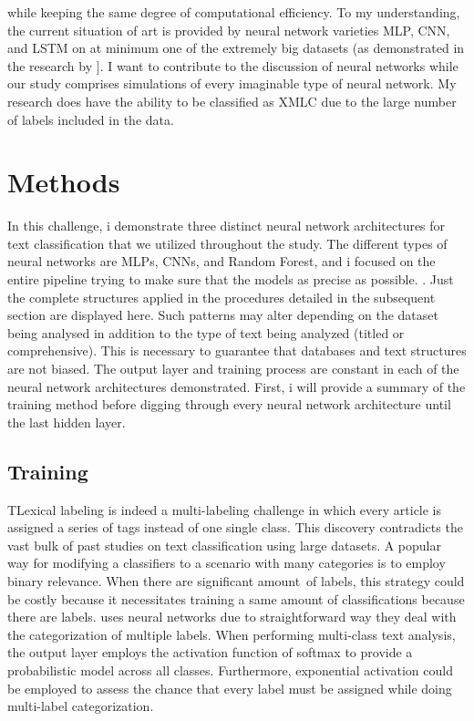 \documentclass[a4paper]{article}
\begin{document}
while keeping the same degree of \cite{bib7}   computational efficiency. To my understanding, the current situation of art is provided by neural network varieties MLP, CNN, and LSTM on at minimum one of the extremely big datasets (as demonstrated in the research by \cite{bib15}]. I want to contribute to the discussion of neural networks while our study comprises simulations of every imaginable type of neural network. My research does have the ability to be classified as XMLC due to the large number of labels included in the data.

\section{Methods}
In this challenge, i demonstrate three distinct neural network architectures for text classification that we utilized throughout the study. The different types of neural networks are MLPs, CNNs, and Random Forest, and i focused on the entire pipeline trying to make sure that the models as precise as possible. \cite{johnson2014effective}. Just the complete structures applied in the procedures detailed in the subsequent section are displayed here. Such patterns may alter depending on the dataset being analysed in addition to the type of text being analyzed (titled or comprehensive). This is necessary to guarantee that databases and text structures are not biased. The output layer and training process are constant in each of the neural network architectures demonstrated. First, i will provide a summary of the training method before digging through every neural network architecture until the last hidden layer.

\subsection{Training}
TLexical labeling is indeed a multi-labeling challenge in which every article is assigned a series of tags instead of one single class. This discovery contradicts the vast bulk of past studies on text classification using large datasets. A popular way for modifying a classifiers to a scenario with many categories is to employ binary relevance. When there are significant amount of labels, this strategy could be costly because it necessitates training a same amount of classifications because there are labels. \cite{zhang2017} uses neural networks due to straightforward way they deal with the categorization of multiple labels. When performing multi-class text analysis, the output layer employs the activation function of softmax to provide a probabilistic model across all classes. Furthermore, exponential activation could be employed to assess the chance that every label must be assigned while doing multi-label categorization.
\end{document}
